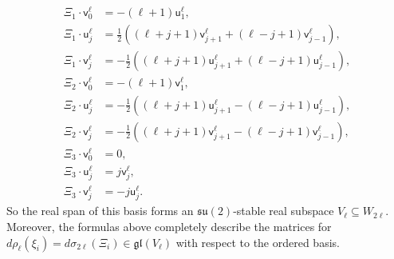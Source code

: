 \documentclass[a4paper,10pt,leqno]{article}
\numberwithin{equation}{section}
\theoremstyle{plain}
\theoremstyle{definition}
\theoremstyle{remark}
\newcommand{\fr}{\mathfrak}
\renewcommand{\sf}{\mathsf}
\begin{document}
\begin{align}
\Xi_1 \cdot \sf{v}_0^\ell &= -(\ell + 1)\sf{u}_1^\ell,\\
	\Xi_1 \cdot \sf{u}_j^\ell &= \tfrac{1}{2}((\ell + j + 1)\sf{v}_{j + 1}^\ell + (\ell - j + 1)\sf{v}_{j - 1}^\ell),\\
	\Xi_1 \cdot \sf{v}_j^\ell &= -\tfrac{1}{2}((\ell + j + 1)\sf{u}_{j + 1}^\ell + (\ell - j + 1)\sf{u}_{j - 1}^\ell),\\
\Xi_2 \cdot \sf{v}_0^\ell &= -(\ell + 1)\sf{v}_1^\ell,\\
	\Xi_2 \cdot \sf{u}_j^\ell &= -\tfrac{1}{2}((\ell + j + 1)\sf{u}_{j + 1}^\ell - (\ell - j + 1)\sf{u}_{j - 1}^\ell),\\
	\Xi_2 \cdot \sf{v}_j^\ell &= -\tfrac{1}{2}((\ell + j + 1)\sf{v}_{j + 1}^\ell - (\ell - j + 1)\sf{v}_{j - 1}^\ell),\\
\Xi_3 \cdot \sf{v}_0^\ell &= 0,\\
	\Xi_3 \cdot \sf{u}_j^\ell &= j\sf{v}_j^\ell,\\
	\Xi_3 \cdot \sf{v}_j^\ell &= -j\sf{u}_j^\ell.
\end{align}
So the real span of this basis forms an $\fr{su}(2)$-stable real subspace $V_\ell \subseteq W_{2\ell}$.
Moreover, the formulas above completely describe the matrices for $d\rho_\ell(\xi_i) = d\sigma_{2\ell}(\Xi_i) \in \fr{gl}(V_\ell)$ with respect to the ordered basis.
\end{document}
